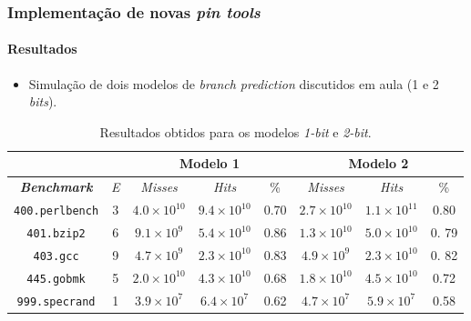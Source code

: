 \documentclass[10pt]{beamer}
\begin{document}
\begin{frame}
\frametitle{Implementação de novas \textit{pin tools}}
\framesubtitle{Resultados}

\begin{itemize}

    \item Simulação de dois modelos de \textit{branch prediction} discutidos em
    aula (1 e 2 \textit{bits}).
  \end{itemize}
  
{\scriptsize 
  \begin{table}[h]
\centering
\caption{\label{tab:modelos} Resultados obtidos para os modelos \textit{1-bit}
e \textit{2-bit}.}
\begin{tabular}{| c | c | c | c | c | c | c | c |}

\hline
\multicolumn{2}{|c|}{} & \multicolumn{3}{c|}{\textbf{Modelo 1}} &
\multicolumn{3}{|c|}{\textbf{Modelo 2}}	\\ 	\hline
\textit{\textbf{Benchmark}} & \textit{E}  & \textit{Misses} & \textit{Hits} &
\% & \textit{Misses} & \textit{Hits} & \% \\
\hline \hline \texttt{400.perlbench} & 3 & \(4.0\times10^{10}\) &
\(9.4\times10^{10}\) & 0.70 & \(2.7\times10^{10}\) & \(1.1\times10^{11}\)
& 0.80 \\
\hline \texttt{401.bzip2} & 6 & \(9.1\times10^{9}\) & \(5.4\times10^{10}\) &
0.86 & \(1.3\times10^{10}\) & \(5.0\times10^{10}\) & 0. 79 \\ \hline
\texttt{403.gcc} & 9 & \(4.7\times10^{9}\) & \(2.3\times10^{10}\) &
0.83 & \(4.9\times10^{9}\) & \(2.3\times10^{10}\) & 0. 82 \\ \hline
\texttt{445.gobmk} & 5 & \(2.0\times10^{10}\) & \(4.3\times10^{10}\)  & 0.68 &
\(1.8\times10^{10}\) & \(4.5\times10^{10}\) & 0.72 \\ \hline
\texttt{999.specrand} & 1 & \(3.9\times10^{7}\) & \(6.4\times10^{7}\) & 0.62 &
\(4.7\times10^{7}\) & \(5.9\times10^{7}\) & 0.58\\ \hline
\end{tabular}
\end{table}

}
\end{frame}
\end{document}
